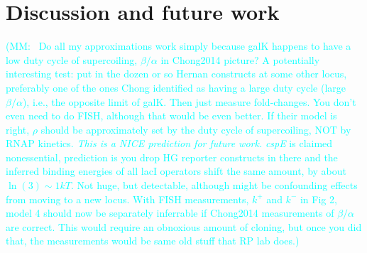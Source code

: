 \documentclass[12pt]{article}%
\newcommand{\mmnote}[1]{\textcolor{cyan}{(MM:~#1)}}
\begin{document}
\section{Discussion and future work}
\mmnote{
Do all my approximations work simply because galK happens to have
a low duty cycle of supercoiling, $\beta/\alpha$ in Chong2014
picture? A potentially interesting test: put in the dozen or so
Hernan constructs at some other locus, preferably one of the ones
Chong identified as having a large duty cycle (large $\beta/\alpha$),
i.e., the opposite limit of galK. Then just measure fold-changes.
You don't even need to do FISH, although that would be even
better. If their model is right, $\rho$ should be approximately
set by the duty cycle of supercoiling, NOT by RNAP kinetics.
\textit{This is a NICE prediction for future work.} \textit{cspE}
is claimed nonessential, prediction is you drop HG reporter
constructs in there and the inferred binding energies of all lacI
operators shift the same amount, by about $\ln(3)\sim 1kT$. Not
huge, but detectable, although might be confounding effects from
moving to a new locus. With FISH measurements, $k^+$ and $k^-$ in
Fig 2, model 4 should now be separately inferrable if Chong2014
measurements of $\beta/\alpha$ are correct. This would require an
obnoxious amount of cloning, but once you did that, the
measurements would be same old stuff that RP lab does.}

\appendix
\end{document}
